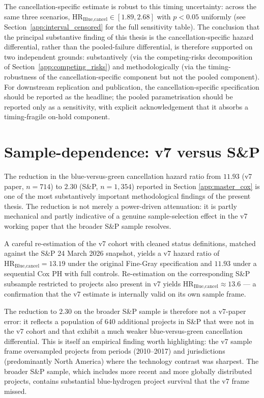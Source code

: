 The cancellation-specific estimate is robust to this timing uncertainty: across the same three scenarios, $\text{HR}_{\text{Blue,cancel}} \in [1.89, 2.68]$ with $p < 0.05$ uniformly (see Section~\ref{app:interval_censored} for the full sensitivity table). The conclusion that the principal substantive finding of this thesis is the cancellation-specific hazard differential, rather than the pooled-failure differential, is therefore supported on two independent grounds: substantively (via the competing-risks decomposition of Section~\ref{app:competing_risks}) and methodologically (via the timing-robustness of the cancellation-specific component but not the pooled component). For downstream replication and publication, the cancellation-specific specification should be reported as the headline; the pooled parametrisation should be reported only as a sensitivity, with explicit acknowledgement that it absorbs a timing-fragile on-hold component.

\section{Sample-dependence: v7 versus S\&P}
\label{app:sample_dependence}

The reduction in the blue-versus-green cancellation hazard ratio from $11.93$ (v7 paper, $n = 714$) to $2.30$ (S\&P, $n = 1{,}354$) reported in Section \ref{app:master_cox} is one of the most substantively important methodological findings of the present thesis. The reduction is not merely a power-driven attenuation: it is partly mechanical and partly indicative of a genuine sample-selection effect in the v7 working paper that the broader S\&P sample resolves.

A careful re-estimation of the v7 cohort with cleaned status definitions, matched against the S\&P 24 March 2026 snapshot, yields a v7 hazard ratio of $\text{HR}_{\text{Blue,cancel}} = 13.19$ under the original Fine-Gray specification and $11.93$ under a sequential Cox PH with full controls. Re-estimation on the corresponding S\&P subsample restricted to projects also present in v7 yields $\text{HR}_{\text{Blue,cancel}} \approx 13.6$ --- a confirmation that the v7 estimate is internally valid on its own sample frame.

The reduction to $2.30$ on the broader S\&P sample is therefore not a v7-paper error: it reflects a population of $640$ additional projects in S\&P that were not in the v7 cohort and that exhibit a much weaker blue-versus-green cancellation differential. This is itself an empirical finding worth highlighting: the v7 sample frame oversampled projects from periods (2010--2017) and jurisdictions (predominantly North America) where the technology contrast was sharpest. The broader S\&P sample, which includes more recent and more globally distributed projects, contains substantial blue-hydrogen project survival that the v7 frame missed.

